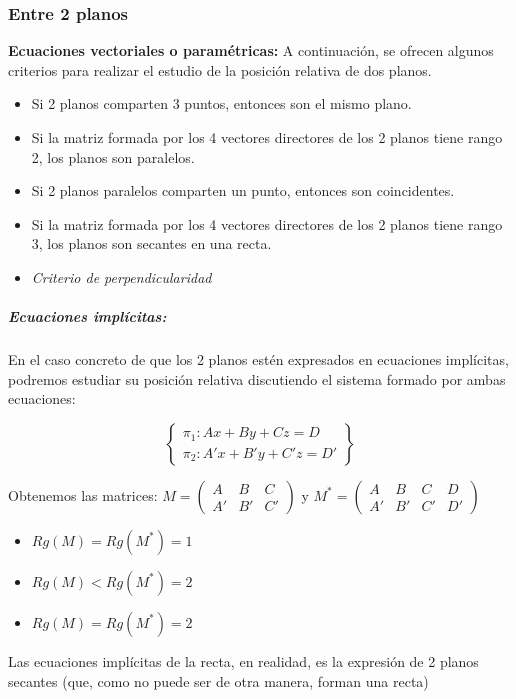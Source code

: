 \subsubsection{Entre 2 planos}  

\begin{framed}
\textbf{Ecuaciones vectoriales o paramétricas:} A continuación, se ofrecen algunos criterios para realizar el estudio de la posición relativa de dos planos.
  \begin{itemize}
    \item Si 2 planos comparten 3 puntos, entonces son el mismo plano.
    \item Si la matriz formada por los 4 vectores directores de los 2 planos tiene rango 2, los planos son paralelos.
    \item Si 2 planos paralelos comparten un punto, entonces son coincidentes.
    \item Si la matriz formada por los 4 vectores directores de los 2 planos tiene rango 3, los planos son secantes en una recta.
    \item \textit{Criterio de perpendicularidad}
  \end{itemize}
\end{framed}



\subparagraph{Ecuaciones implícitas:} En el caso concreto de que los 2 planos estén expresados en ecuaciones implícitas, podremos estudiar su posición relativa discutiendo el sistema formado por ambas ecuaciones:

\[
\left\{\begin{array}{c}
\pi_1: Ax+By+Cz = D\\
\pi_2: A'x+B'y+C'z = D'
\end{array}\right\}
\]

Obtenemos las matrices: $M = \displaystyle\begin{pmatrix}A&B&C\\A'&B'&C'\end{pmatrix}$ y $M^* = \displaystyle\begin{pmatrix}A&B&C&D\\A'&B'&C'&D'\end{pmatrix}$

\begin{framed}
  \begin{itemize}
    \item $Rg(M) = Rg(M^*) = 1 $
    \item $Rg(M) < Rg(M^*) = 2 $
    \item $Rg(M) = Rg(M^*) = 2 $
  \end{itemize}
\obs Las ecuaciones implícitas de la recta, en realidad, es la expresión de 2 planos secantes (que, como no puede ser de otra manera, forman una recta)
\end{framed}

